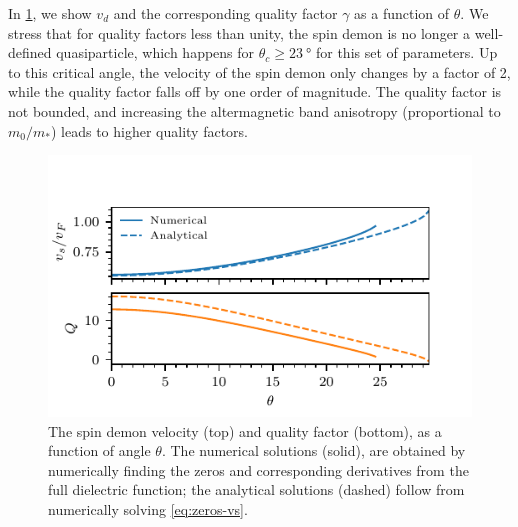 \documentclass[aps,prl,reprint,twocolumns,superscriptaddress]{revtex4-2}
\newcommand{\vs}{v_d}
\begin{document}
	
	In \cref{fig:vs-and-Q}, we show $\vs$ and the corresponding quality factor $\gamma$ as a function of $\theta$. We stress that for quality factors less than unity, the spin demon is no longer a well-defined quasiparticle, which happens for $\theta_c\ge\SI{23}{\degree}$ for this set of parameters. Up to this critical angle, the velocity of the spin demon only changes by a factor of 2, while the quality factor falls off by one order of magnitude. The quality factor is not bounded, and increasing the altermagnetic band anisotropy (proportional to $m_0/m_*$) leads to higher quality factors.
	
	
	\begin{figure}
		\includegraphics{angles_vs_and_Q}
		\caption{The spin demon velocity (top) and quality factor (bottom), as a function of angle $\theta$. The numerical solutions (solid),  are obtained by numerically finding the zeros and corresponding derivatives from the full dielectric function; the analytical solutions (dashed) follow from numerically solving \cref{eq:zeros-vs}. 
			\label{fig:vs-and-Q} }
	\end{figure}
	
\end{document}
